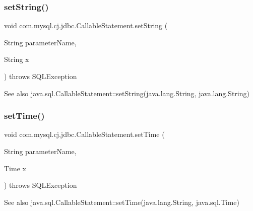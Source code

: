 \subsubsection{\texorpdfstring{set\+String()}{setString()}}
{\footnotesize\ttfamily void com.\+mysql.\+cj.\+jdbc.\+Callable\+Statement.\+set\+String (\begin{DoxyParamCaption}\item[{String}]{parameter\+Name,  }\item[{String}]{x }\end{DoxyParamCaption}) throws S\+Q\+L\+Exception}

\begin{DoxySeeAlso}{See also}
java.\+sql.\+Callable\+Statement\+::set\+String(java.\+lang.\+String, java.\+lang.\+String) 
\end{DoxySeeAlso}
\mbox{\label{classcom_1_1mysql_1_1cj_1_1jdbc_1_1_callable_statement_abaeaf443ba9998c9378de127b63c4eaa}} 
\subsubsection{\texorpdfstring{set\+Time()}{setTime()}\hspace{0.1cm}{\footnotesize\ttfamily [1/2]}}
{\footnotesize\ttfamily void com.\+mysql.\+cj.\+jdbc.\+Callable\+Statement.\+set\+Time (\begin{DoxyParamCaption}\item[{String}]{parameter\+Name,  }\item[{Time}]{x }\end{DoxyParamCaption}) throws S\+Q\+L\+Exception}

\begin{DoxySeeAlso}{See also}
java.\+sql.\+Callable\+Statement\+::set\+Time(java.\+lang.\+String, java.\+sql.\+Time) 
\end{DoxySeeAlso}
\mbox{\label{classcom_1_1mysql_1_1cj_1_1jdbc_1_1_callable_statement_ab2ce9627abfa776a9a481cc4f496d2ae}} 
